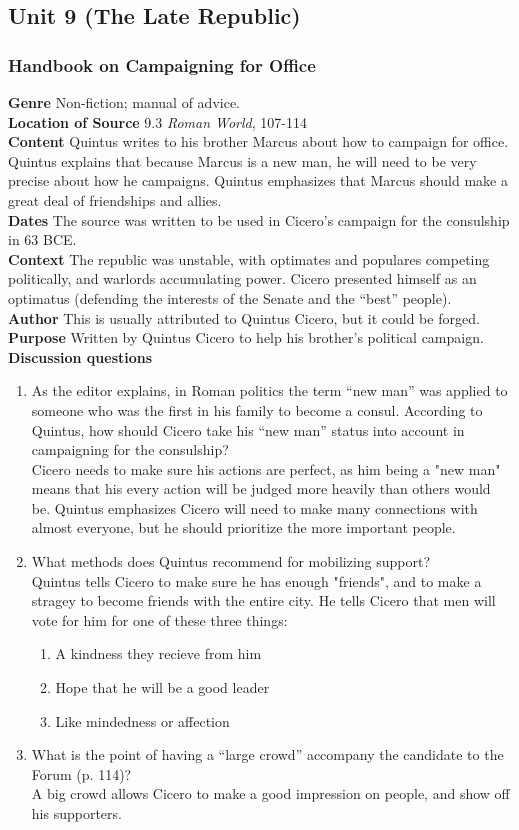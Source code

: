 \documentclass{article}
\begin{document}
\subsection*{Unit 9 (The Late Republic)}
\subsubsection*{Handbook on Campaigning for Office}
\textbf{Genre}
Non-fiction; manual of advice. \\
\textbf{Location of Source}
9.3 \textit{Roman World}, 107-114 \\
\textbf{Content}
Quintus writes to his brother Marcus about how to campaign for office. Quintus explains that
because Marcus is a new man, he will need to be very precise about how he campaigns.
Quintus emphasizes that Marcus should make a great deal of friendships and allies. \\
\textbf{Dates}
The source was written to be used in Cicero’s campaign for the consulship in 63 BCE. \\
\textbf{Context}
The republic was unstable, with optimates and populares competing politically, and warlords
accumulating power. Cicero presented himself as an optimatus (defending the interests of
the Senate and the “best” people). \\
\textbf{Author}
This is usually attributed to Quintus Cicero, but it could be forged. \\
\textbf{Purpose}
Written by Quintus Cicero to help his brother’s political campaign. \\
\textbf{Discussion questions}
\begin{enumerate}
  \item As the editor explains, in Roman politics the term “new man” was applied to someone
  who was the first in his family to become a consul. According to Quintus, how should Cicero
  take his “new man” status into account in campaigning for the consulship? \\
  Cicero needs to make sure his actions are perfect, as him being a "new man" means that
  his every action will be judged more heavily than others would be. Quintus emphasizes
  Cicero will need to make many connections with almost everyone, but he should prioritize
  the more important people.
  \item What methods does Quintus recommend for mobilizing support? \\
  Quintus tells Cicero to make sure he has enough "friends", and to make a stragey to
  become friends with the entire city. He tells Cicero that men will vote for him for one of
  these three things:
  \begin{enumerate}
    \item A kindness they recieve from him
    \item Hope that he will be a good leader
    \item Like mindedness or affection
  \end{enumerate}
  \item What is the point of having a “large crowd” accompany the candidate to the Forum
  (p. 114)? \\
  A big crowd allows Cicero to make a good impression on people, and show off his
  supporters.
\end{enumerate}
\end{document}

